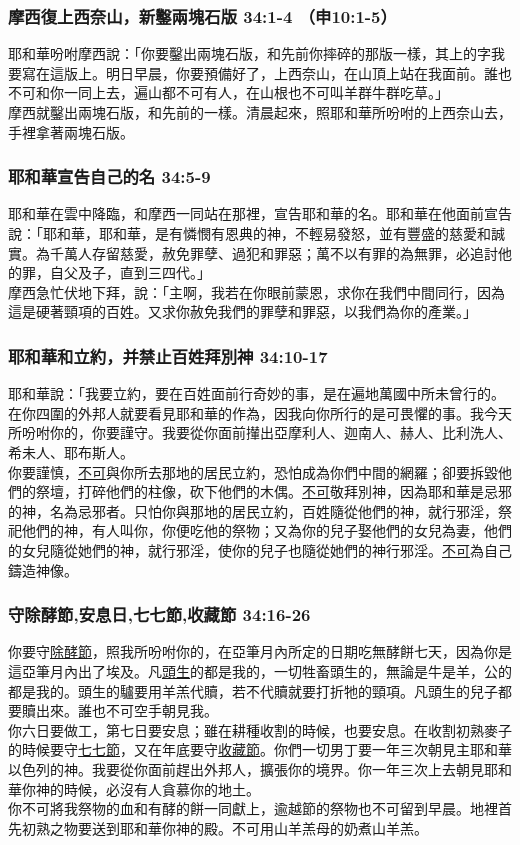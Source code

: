 \begin{table}
\subsubsection{摩西復上西奈山，新鑿兩塊石版 34:1-4 （申10:1-5）}
耶和華吩咐摩西說：「你要鑿出兩塊石版，和先前你摔碎的那版一樣，其上的字我要寫在這版上。明日早晨，你要預備好了，上西奈山，在山頂上站在我面前。誰也不可和你一同上去，遍山都不可有人，在山根也不可叫羊群牛群吃草。」 \\
摩西就鑿出兩塊石版，和先前的一樣。清晨起來，照耶和華所吩咐的上西奈山去，手裡拿著兩塊石版。

\subsubsection{耶和華宣告自己的名 34:5-9}
耶和華在雲中降臨，和摩西一同站在那裡，宣告耶和華的名。耶和華在他面前宣告說：「耶和華，耶和華，是有憐憫有恩典的神，不輕易發怒，並有豐盛的慈愛和誠實。為千萬人存留慈愛，赦免罪孽、過犯和罪惡；萬不以有罪的為無罪，必追討他的罪，自父及子，直到三四代。」 \\
摩西急忙伏地下拜，說：「主啊，我若在你眼前蒙恩，求你在我們中間同行，因為這是硬著頸項的百姓。又求你赦免我們的罪孽和罪惡，以我們為你的產業。」

\subsubsection{耶和華和立約，并禁止百姓拜別神 34:10-17}
耶和華說：「我要立約，要在百姓面前行奇妙的事，是在遍地萬國中所未曾行的。在你四圍的外邦人就要看見耶和華的作為，因我向你所行的是可畏懼的事。我今天所吩咐你的，你要謹守。我要從你面前攆出亞摩利人、迦南人、赫人、比利洗人、希未人、耶布斯人。\\
你要謹慎，\underline{不可}與你所去那地的居民立約，恐怕成為你們中間的網羅；卻要拆毀他們的祭壇，打碎他們的柱像，砍下他們的木偶。\underline{不可}敬拜別神，因為耶和華是忌邪的神，名為忌邪者。只怕你與那地的居民立約，百姓隨從他們的神，就行邪淫，祭祀他們的神，有人叫你，你便吃他的祭物；又為你的兒子娶他們的女兒為妻，他們的女兒隨從她們的神，就行邪淫，使你的兒子也隨從她們的神行邪淫。\underline{不可}為自己鑄造神像。

\subsubsection{守除酵節,安息日,七七節,收藏節 34:16-26}
你要守\underline{除酵節}，照我所吩咐你的，在亞筆月內所定的日期吃無酵餅七天，因為你是這亞筆月內出了埃及。凡\underline{頭生}的都是我的，一切牲畜頭生的，無論是牛是羊，公的都是我的。頭生的驢要用羊羔代贖，若不代贖就要打折牠的頸項。凡頭生的兒子都要贖出來。誰也不可空手朝見我。\\
你六日要做工，第七日要安息；雖在耕種收割的時候，也要安息。在收割初熟麥子的時候要守\underline{七七節}，又在年底要守\underline{收藏節}。你們一切男丁要一年三次朝見主耶和華以色列的神。我要從你面前趕出外邦人，擴張你的境界。你一年三次上去朝見耶和華你神的時候，必沒有人貪慕你的地土。\\
你不可將我祭物的血和有酵的餅一同獻上，逾越節的祭物也不可留到早晨。地裡首先初熟之物要送到耶和華你神的殿。不可用山羊羔母的奶煮山羊羔。\\


\end{table}
